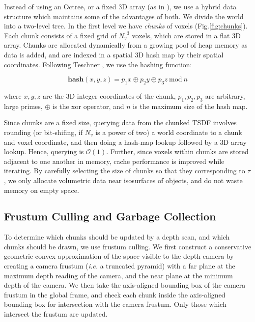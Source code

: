 \documentclass[10pt,twocolumn,letterpaper]{article}
\newcommand{\figref}[1]{Fig.\ref{#1}}
\begin{document}
Instead of using an Octree, or a fixed 3D array (as in \cite{Newcombe,
Whelan2013}), we use a hybrid data structure which maintains some of the
advantages of both. We divide the world into a two-level tree. In the first
level we have \emph{chunks} of voxels (\figref{fig:chunks}). Each chunk consists of a
fixed grid of ${N_v}^3$ voxels, which are stored in a flat 3D array. Chunks are
allocated dynamically from a growing pool of heap memory as data is added, and
are indexed in a spatial 3D hash map \cite{SpatialHashing} by their spatial
coordinates. Following Teschner \etal \cite{SpatialHashing}, we use the
hashing function:

\begin{equation}
\textbf{hash}(x, y, z) = p_1 x\oplus p_2 y \oplus p_3 z
~\text{mod}~n
\end{equation}

\noindent where $x, y, z$ are the 3D integer coordinates of the chunk, $p_1,
p_2, p_3$ are arbitrary, large primes, $\oplus$ is the xor operator, and $n$ is
the maximum size of the hash map.

Since chunks are a fixed size, querying data from the chunked TSDF involves
rounding (or bit-shifing, if $N_v$ is a power of two) a world coordinate to a
chunk and voxel coordinate, and then doing a hash-map lookup followed by a 3D
array lookup. Hence, querying is $\mathcal{O}(1)$. Further, since voxels within
chunks are stored adjacent to one another in memory, cache performance is
improved while iterating. By carefully selecting the size of chunks so that they
corresponding to $\tau$, we only allocate volumetric data near isosurfaces of
objects, and do not waste memory on empty space.

\subsection{Frustum Culling and Garbage Collection}
\label{section:frustum}
To determine which chunks should be updated by a depth scan, and which chunks
should be drawn, we use frustum culling. We first construct a conservative
geometric convex approximation of the space visible to the depth camera by
creating a camera frustum (\textit{i.e.} a truncated pyramid) with a far plane
at the maximum depth reading of the camera, and the near plane at the minimum
depth of the camera. We then take the axis-aligned bounding box of the camera
frustum in the global frame, and check each chunk inside the axis-aligned
bounding box for intersection with the camera frustum. Only those which
intersect the frustum are updated. 
\end{document}
